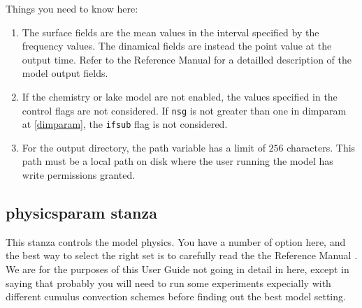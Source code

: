 Things you need to know here:

\begin{enumerate}
\item The surface fields are the mean values in the interval specified by
the frequency values. The dinamical fields are instead the point value at the
output time. Refer to the Reference Manual \cite{refman_11} for a detailled
description of the model output fields.
\item If the chemistry or lake model are not enabled, the values specified in
the control flags are not considered. If \verb=nsg= is not greater than one
in dimparam at \ref{dimparam}, the \verb=ifsub= flag is not considered.
\item For the output directory, the path variable has a limit of $256$
characters. This path must be a local path on disk where the user running
the model has write permissions granted.
\end{enumerate}

\subsection{physicsparam stanza}
\label{physicsparam}

This stanza controls the model physics. You have a number of option here,
and the best way to select the right set is to carefully read the the
Reference Manual \cite{refman_11}. We are for the purposes of this User Guide
not going in detail in here, except in saying that probably you will need
to run some experiments expecially with different cumulus convection
schemes before finding out the best model setting.

